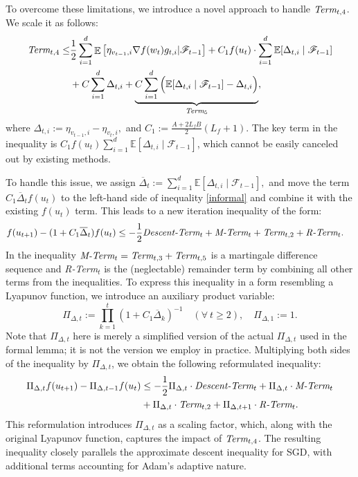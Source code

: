 \documentclass{article} %
\DeclareMathOperator{\Expect}{\mathbb{E}}
\begin{document}
To overcome these limitations, we introduce a novel approach to handle $\emph{Term}_{t,4}$. We scale it as follows:
\begin{align*}
\emph{Term}_{t,4}\le & \frac{1}{2}\sum_{i=1}^{d}\Expect\left[\eta_{v_{t-1},i}\nabla f(w_{t})g_{t,i}|\mathscr{F}_{t-1}\right]+ C_{1}f(u_{t}) \cdot \sum_{i=1}^{d}\mathbb{E}[\Delta_{t,i} \mid \mathscr{F}_{t-1}]\notag\\
& + C\sum_{i=1}^{d}\Delta_{t,i} + \underbrace{C\sum_{i=1}^{d}\Big(\mathbb{E}[\Delta_{t,i} \mid \mathscr{F}_{t-1}] - \Delta_{t,i}\Big)}_{\emph{Term}_5} ,
\end{align*}
where $\Delta_{t,i}:=\eta_{v_{t-1},i}-\eta_{v_{t},i},$ and $C_{1}:=\frac{A + 2L_{f}B}{2}(L_{f}+1).$ The key term in the inequality is $C_{1}f(u_{t}) \sum_{i=1}^{d}\mathbb{E}[\Delta_{t,i} \mid \mathscr{F}_{t-1}]$, which cannot be easily canceled out by existing methods. 

To handle this issue, we assign $\overline{\Delta}_{t}:=\sum_{i=1}^{d}\mathbb{E}[\Delta_{t,i} \mid \mathscr{F}_{t-1}],$ and move the term $C_{1}\overline{\Delta}_{t}f(u_{t})$ to the left-hand side of inequality \ref{informal} and combine it with the existing \(f(u_{t})\) term. This leads to a new iteration inequality of the form:
\begin{align}\label{informal1}
    f(u_{t+1})-(1+C_{1}\overline{\Delta}_{t})f(u_{t})&\le -\frac{1}{2}\emph{Descent-Term}_{t}+\emph{M-Term}_{t}+\emph{Term}_{t,2}+\emph{R-Term}_{t}.
\end{align}
In the inequality $\emph{M-Term}_t=\emph{Term}_{t,3}+\emph{Term}_{t,5}$ is a martingale difference sequence and \emph{R-Term}$_t$ is the (neglectable) remainder term by combining all other terms from the inequalities. To express this inequality in a form resembling a Lyapunov function, we introduce an auxiliary product variable:
\[\Pi_{\Delta,t}:=\prod_{k=1}^{t}(1+C_{1}\overline{\Delta}_{k})^{-1} \quad (\forall\ t\ge 2), \quad \Pi_{\Delta,1}:=1. \tag*{(Informal)}\]
Note that \(\Pi_{\Delta,t}\) here is merely a simplified version of the actual \(\Pi_{\Delta,t}\) used in the formal lemma; it is not the version we employ in practice. Multiplying both sides of the inequality by $\Pi_{\Delta,t}$, we obtain the following reformulated inequality:
\begin{align}\label{informal2}
    \Pi_{\Delta,t}f(u_{t+1})-\Pi_{\Delta,t-1}f(u_{t})&\le -\frac{1}{2}\Pi_{\Delta,t}\cdot\emph{Descent-Term}_{t}+\Pi_{\Delta,t}\cdot\emph{M-Term}_{t}\notag\\
    &+\Pi_{\Delta,t}\cdot \emph{Term}_{t,2}+\Pi_{\Delta,t+1}\cdot\emph{R-Term}_{t}.
\end{align}
This reformulation introduces $\Pi_{\Delta,t}$ as a scaling factor, which, along with the original Lyapunov function, captures the impact of $\emph{Term}_{t,4}$. The resulting inequality closely parallels the approximate descent inequality for SGD, with additional terms accounting for Adam's adaptive nature.
\end{document}
